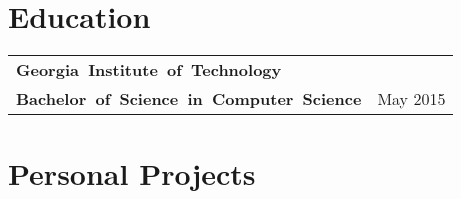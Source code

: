 \documentclass[letterpaper, oneside, final, 10pt]{scrartcl} %
\newcommand{\gray}{\rowcolor[gray]{.90}} %
\begin{document}
\begin{center}
\section{Education}

\begin{tabularx}{\linewidth}{Xl}
\gray \textbf{\mbox{Georgia Institute of Technology}} & \\
\gray \textbf{\mbox{Bachelor of Science in Computer Science}} & May 2015
\end{tabularx}

\vspace{-14pt} %


\section{Personal Projects}


\end{center}
\end{document}
